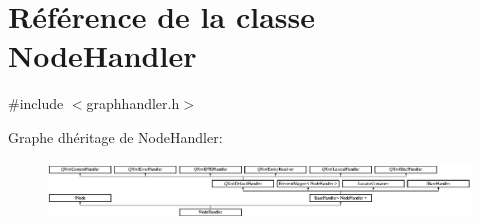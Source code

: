 \hypertarget{class_node_handler}{}\section{Référence de la classe Node\+Handler}
\label{class_node_handler}


{\ttfamily \#include $<$graphhandler.\+h$>$}

Graphe d\textquotesingle{}héritage de Node\+Handler\+:\begin{figure}[H]
\begin{center}
\leavevmode
\includegraphics[height=1.545894cm]{class_node_handler}
\end{center}
\end{figure}

